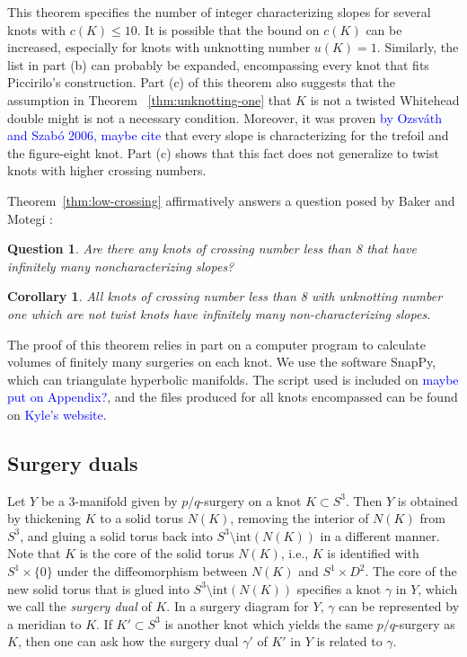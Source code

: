 \documentclass[11pt,usenames,dvipsnames,reqno]{amsart}
\numberwithin{theorem}{section}
\newtheorem{corollary}[theorem]{Corollary}
\newtheorem{question}[theorem]{Question}
\theoremstyle{ex}
\theoremstyle{rem}
\def\kh#1{\textcolor{Blue}{#1}}
\begin{document}
This theorem specifies the number of integer characterizing slopes for several knots with $c(K) \leq 10$. It is possible that the bound on $c(K)$ can be increased, especially for knots with unknotting number $u(K) = 1$. Similarly, the list in part (b) can probably be expanded, encompassing every knot that fits Piccirilo's construction. Part (c) of this theorem also suggests that the assumption in Theorem ~\ref{thm:unknotting-one} that $K$ is not a twisted Whitehead double might is not a necessary condition. Moreover, it was proven \kh{by Ozsv\'{a}th and Szab\'{o} 2006, maybe cite}  that every slope is characterizing for the trefoil and the figure-eight knot. Part (c) shows that this fact does not generalize to twist knots with higher crossing numbers.

Theorem~\ref{thm:low-crossing} affirmatively answers a question posed by Baker and Motegi \cite[Question~1.7]{baker-motegi}:

\begin{question}
	Are there any knots of crossing number less than 8 that have infinitely many noncharacterizing slopes? 
\end{question}

\begin{corollary}
	All knots of crossing number less than 8 with unknotting number one which are not twist knots have infinitely many non-characterizing slopes.
\end{corollary}

The proof of this theorem relies in part on a computer program to calculate volumes of finitely many surgeries on each knot. We use the software SnapPy, which can triangulate hyperbolic manifolds. The script used is included on \kh{maybe put on Appendix?}, and the files produced for all knots encompassed can be found on \kh{Kyle's website}.

\subsection{Surgery duals} Let $Y$ be a 3-manifold given by $p/q$-surgery on a knot $K\subset S^3$. Then $Y$ is obtained by thickening $K$ to a solid torus $N(K)$, removing the interior of $N(K)$ from $S^3$, and gluing a solid torus back into $S^3\setminus\mathrm{int}(N(K))$ in a different manner. Note that $K$ is the core of the solid torus $N(K)$, i.e., $K$ is identified with $S^1\times\{0\}$ under the diffeomorphism between $N(K)$ and $S^1\times D^2$. The core of the new solid torus that is glued into $S^3\setminus\mathrm{int}(N(K))$ specifies a knot $\gamma$ in $Y$, which we call the \textit{surgery dual} of $K$. In a surgery diagram for $Y$, $\gamma$ can be represented by a meridian to $K$. If $K'\subset S^3$ is another knot which yields the same $p/q$-surgery as $K$, then one can ask how the surgery dual $\gamma'$ of $K'$ in $Y$ is related to $\gamma$. 
\end{document}
